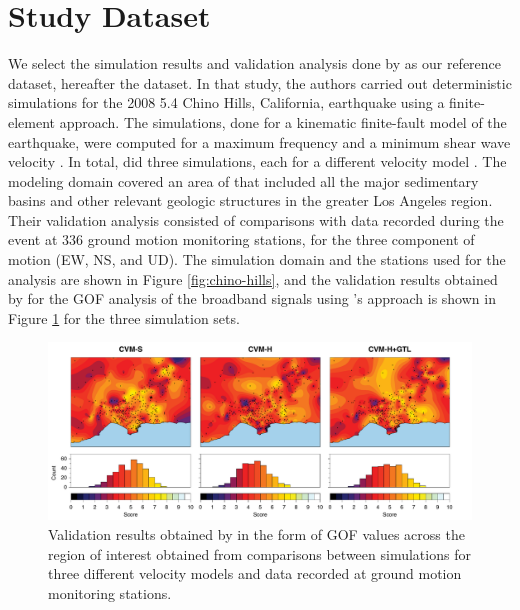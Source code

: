 
\section{Study Dataset}

We select the simulation results and validation analysis done by \citet{Taborda_2014_BSSA} as our reference dataset, hereafter the dataset. In that study, the authors carried out deterministic simulations for the 2008  5.4 Chino Hills, California, earthquake using a finite-element approach. The simulations, done for a kinematic finite-fault model of the earthquake, were computed for a maximum frequency  and a minimum shear wave velocity . In total, \citet{Taborda_2014_BSSA} did three simulations, each for a different velocity model \citep[CVM-S4, CVM-H, CVM-H+GTL, see][]{Small_2017_SRL}. The modeling domain covered an area of  that included all the major sedimentary basins and other relevant geologic structures in the greater Los Angeles region. Their validation analysis consisted of comparisons with data recorded during the event at 336 ground motion monitoring stations, for the three component of motion (EW, NS, and UD). The simulation domain and the stations used for the analysis are shown in Figure \ref{fig:chino-hills}, and the validation results obtained by \citet{Taborda_2014_BSSA} for the GOF analysis of the broadband signals using \citeauthor{Anderson_2004_Proc}'s approach is shown in Figure \ref{fig:ref-gof-maps} for the three simulation sets.

\begin{figure}
    \centering
    \includegraphics[width=\textwidth]{figures/pdf/figure-02}
    \caption{Validation results obtained by \citet{Taborda_2014_BSSA} in the form of GOF values across the region of interest obtained from comparisons between simulations for three different velocity models and data recorded at ground motion monitoring stations.}
    \label{fig:ref-gof-maps}
\end{figure}

